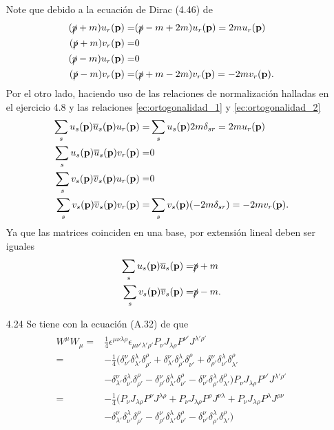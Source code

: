\documentclass{article}
\begin{document}
\begin{enumerate}
Note que debido a la ecuación de Dirac (4.46) de \cite{Lahiri2005}
\begin{align}
\begin{split}
(\slashed{p}+m)u_r(\vb{p})=&(\slashed{p}-m+2m)u_r(\vb{p})=2mu_r(\vb{p})\\
(\slashed{p}+m)v_r(\vb{p})=&0\\
(\slashed{p}-m)u_r(\vb{p})=&0\\
(\slashed{p}-m)v_r(\vb{p})=&(\slashed{p}+m-2m)v_r(\vb{p})=-2mv_r(\vb{p}).
\end{split}
\end{align}
Por el otro lado, haciendo uso de las relaciones de normalización halladas en el ejercicio 4.8 y las relaciones \eqref{ec:ortogonalidad_1} y \eqref{ec:ortogonalidad_2}
\begin{align}
\begin{split}
\sum_s u_s(\vb{p})\overline{u}_s(\vb{p})u_r(\vb{p})=&\sum_s u_s(\vb{p})2m\delta_{sr}=2mu_r(\vb{p})\\
\sum_s u_s(\vb{p})\overline{u}_s(\vb{p})v_r(\vb{p})=&0\\
\sum_s v_s(\vb{p})\overline{v}_s(\vb{p})u_r(\vb{p})=&0\\
\sum_s v_s(\vb{p})\overline{v}_s(\vb{p})v_r(\vb{p})=&\sum_s v_s(\vb{p})(-2m\delta_{sr})=-2mv_r(\vb{p}).
\end{split}
\end{align}
Ya que las matrices coinciden en una base, por extensión lineal deben ser iguales
\begin{align}
\begin{split}
\sum_s u_s(\vb{p})\overline{u}_s(\vb{p})=&\slashed{p}+m\\
\sum_s v_s(\vb{p})\overline{v}_s(\vb{p})=&\slashed{p}-m.
\end{split}
\end{align}

\item[4.24] Se tiene con la ecuación (A.32) de \cite{Lahiri2005} que
\begin{align}
\begin{split}
W^\mu W_\mu=&\frac{1}{4}\epsilon^{\mu\nu\lambda\rho}\epsilon_{\mu\nu'\lambda'\rho'}P_\nu J_{\lambda\rho}P^{\nu'} J^{\lambda'\rho'}\\
=&-\frac{1}{4}(\delta^\nu_{\nu'}\delta^\lambda_{\lambda'}\delta^\rho_{\rho'}+\delta^\nu_{\lambda'}\delta^\lambda_{\rho'}\delta^\rho_{\nu'}+\delta^\nu_{\rho'}\delta^\lambda_{\nu'}\delta^\rho_{\lambda'}\\
&-\delta^\nu_{\lambda'}\delta^\lambda_{\nu'}\delta^\rho_{\rho'}-\delta^\nu_{\rho'}\delta^\lambda_{\lambda'}\delta^\rho_{\nu'}-\delta^\nu_{\nu'}\delta^\lambda_{\rho'}\delta^\rho_{\lambda'})P_\nu J_{\lambda\rho}P^{\nu'} J^{\lambda'\rho'}\\
=&-\frac{1}{4}(P_\nu J_{\lambda\rho}P^{\nu} J^{\lambda\rho}+P_\nu J_{\lambda\rho}P^{\rho} J^{\nu\lambda}+P_\nu J_{\lambda\rho}P^{\lambda} J^{\rho\nu}\\
&-\delta^\nu_{\lambda'}\delta^\lambda_{\nu'}\delta^\rho_{\rho'}-\delta^\nu_{\rho'}\delta^\lambda_{\lambda'}\delta^\rho_{\nu'}-\delta^\nu_{\nu'}\delta^\lambda_{\rho'}\delta^\rho_{\lambda'})
\end{split}
\end{align}


\end{enumerate}
\end{document}
